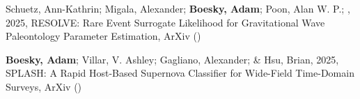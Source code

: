 \item[{\color{numcolor}\scriptsize2}] Schuetz, Ann-Kathrin; Migala, Alexander; \textbf{Boesky, Adam}; Poon, Alan W. P.; \etal, 2025, RESOLVE: Rare Event Surrogate Likelihood for Gravitational Wave Paleontology Parameter Estimation, ArXiv ()

\item[{\color{numcolor}\scriptsize1}] \textbf{Boesky, Adam}; Villar, V. Ashley; Gagliano, Alexander; \& Hsu, Brian, 2025, SPLASH: A Rapid Host-Based Supernova Classifier for Wide-Field Time-Domain Surveys, ArXiv ()
